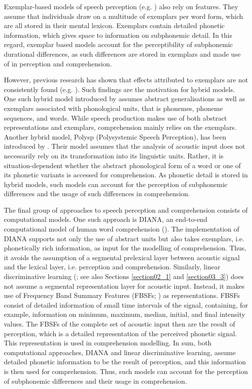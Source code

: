 Exemplar-based models of speech perception (e.g. \cite{Goldinger1996}) also rely on features. They assume that individuals draw on a multitude of exemplars per word form, which are all stored in their mental lexicon. Exemplars contain detailed phonetic information, which gives space to information on subphonemic detail. In this regard, exemplar based models account for the perceptibility of subphonemic durational differences, as such differences are stored in exemplars and made use of in perception and comprehension. 

However, previous research has shown that effects attributed to exemplars are not consistently found (e.g. \cite{Hanique2013Aalders}). Such findings are the motivation for hybrid models. One such hybrid model introduced by \citet{Pierrehumbert2002} assumes abstract generalisations as well as exemplars associated with phonological units, that is phonemes, phoneme sequences, and words. While speech production makes use of both abstract representations and exemplars, comprehension mainly relies on the exemplars. Another hybrid model, Polysp (Polysystemic Speech Perception), has been introduced by \citet{Hawkins2001}. Their model assumes that the analysis of acoustic input does not necessarily rely on its transformation into its linguistic units. Rather, it is situation-dependent whether the abstract phonological form of a word or one of its phonetic variants is accessed for comprehension. As phonetic detail is stored in hybrid models, such models can account for the perception of subphonemic differences and the usage of such differences in comprehension.

The final group of approaches to speech perception and comprehension consists of computational models. One such approach is DIANA, an end-to-end computational model of human word comprehension (\cite{tenBosch2015, tenBosch2021}). The implementation of DIANA supports not only the use of abstract units but also takes exemplars, i.e. phonetically rich information, as input for the modelling of comprehension. Thus, it avoids the assumption of a segmental prelexical layer between acoustic signal and the lexical layer, i.e. perception and comprehension. Similarly, linear discriminative learning (\cite{Baayen2019}; see also Sections \ref{section02_1} and \ref{section03_3}) does not assume a segmental representation layer for acoustic input. Instead, it makes use of Frequency Band Summary Features (FBSFs; \cite{Arnold2017}) as representations. FBSFs consist of detailed information of small time intervals of the signal, containing, for example, information on minimum, maximum, median, initial, and final intensity values. The FBSFs of the complete set of acoustic input then are the result of perception, which is a detailed representation of the perceived phonetic signal. This representation is used in comprehension modelling. In sum, both computational approaches, DIANA and linear discriminative learning, assume detailed phonetic information to be the result of perception, and this information is then used for comprehension. Thus, such models can account for the perception of subphonemic differences and their usage in comprehension. 

